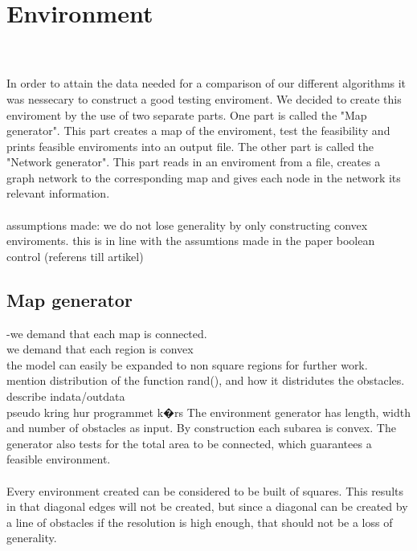 \chapter{Environment}
\\
\\In order to attain the data needed for a comparison of our different algorithms it was nessecary to construct a good testing enviroment. We decided to create this enviroment by the use of two separate parts. One part is called the "Map generator". This part creates a map of the enviroment, test the feasibility and prints feasible enviroments into an output file. The other part is called the "Network generator". This part reads in an enviroment from a file, creates a graph network to the corresponding map and gives each node in the network its relevant information. 
\\
\\assumptions made: we do not lose generality by only constructing convex enviroments. this is in line with the assumtions made in the paper boolean control (referens till artikel)

\section{Map generator}
-we demand that each map is connected.
\\ we demand that each region is convex
\\the model can easily be expanded to non square regions for further work.
\\mention distribution of the function rand(), and how it distridutes the obstacles.
\\describe indata/outdata
\\pseudo kring hur programmet k�rs
The environment generator has length, width and number of obstacles as input. By construction each subarea is convex. The generator also tests for the total area to be connected, which guarantees a feasible environment.\\
\\
Every environment created can be considered to be built of squares. This results in that diagonal edges will not be created, but since a diagonal can be created by a line of obstacles if the resolution is high enough, that should not be a loss of generality. \\
\\
\\

